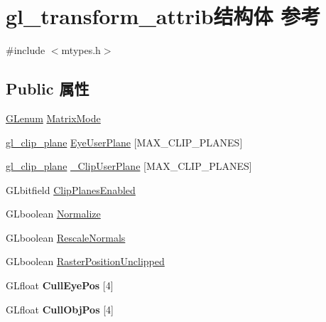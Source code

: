 \hypertarget{structgl__transform__attrib}{}\section{gl\+\_\+transform\+\_\+attrib结构体 参考}
\label{structgl__transform__attrib}


{\ttfamily \#include $<$mtypes.\+h$>$}

\subsection*{Public 属性}
\begin{DoxyCompactItemize}
\item 
\hyperlink{interfacevoid}{G\+Lenum} \hyperlink{structgl__transform__attrib_a29e03bf115751b60423f3d930e1d44fa}{Matrix\+Mode}
\item 
\hyperlink{mtypes_8h_a972a26c84b39b96ed7928da29a0b5aad}{gl\+\_\+clip\+\_\+plane} \hyperlink{structgl__transform__attrib_ac8bb192d5d8e27e3542356546438253e}{Eye\+User\+Plane} \mbox{[}M\+A\+X\+\_\+\+C\+L\+I\+P\+\_\+\+P\+L\+A\+N\+ES\mbox{]}
\item 
\hyperlink{mtypes_8h_a972a26c84b39b96ed7928da29a0b5aad}{gl\+\_\+clip\+\_\+plane} \hyperlink{structgl__transform__attrib_aaec3ffb9f3eb7d533efd2b652c0355dd}{\+\_\+\+Clip\+User\+Plane} \mbox{[}M\+A\+X\+\_\+\+C\+L\+I\+P\+\_\+\+P\+L\+A\+N\+ES\mbox{]}
\item 
G\+Lbitfield \hyperlink{structgl__transform__attrib_a3613ff083d1b58b858558d4ed23e033a}{Clip\+Planes\+Enabled}
\item 
G\+Lboolean \hyperlink{structgl__transform__attrib_a30f6046f34c1aa5e83d472b3c53b7793}{Normalize}
\item 
G\+Lboolean \hyperlink{structgl__transform__attrib_a03c01438878cbd22d46cdaab5b558362}{Rescale\+Normals}
\item 
G\+Lboolean \hyperlink{structgl__transform__attrib_aa9dd418bbf040f418928ee89bd212152}{Raster\+Position\+Unclipped}
\item 
\mbox{\label{structgl__transform__attrib_a46b194961a014d3d406cd192a71c8e64}} 
G\+Lfloat {\bfseries Cull\+Eye\+Pos} \mbox{[}4\mbox{]}
\item 
\mbox{\label{structgl__transform__attrib_a188784cbc4ae08593ac144d1598fad36}} 
G\+Lfloat {\bfseries Cull\+Obj\+Pos} \mbox{[}4\mbox{]}
\end{DoxyCompactItemize}



